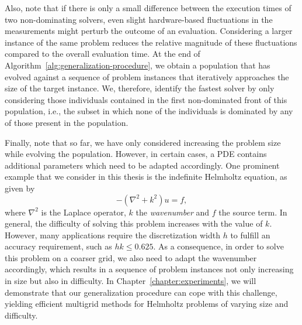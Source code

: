 Also, note that if there is only a small difference between the execution times of two non-dominating solvers, even slight hardware-based fluctuations in the measurements might perturb the outcome of an evaluation.
Considering a larger instance of the same problem reduces the relative magnitude of these fluctuations compared to the overall evaluation time.
At the end of Algorithm~\ref{alg:generalization-procedure}, we obtain a population that has evolved against a sequence of problem instances that iteratively approaches the size of the target instance.
We, therefore, identify the fastest solver by only considering those individuals contained in the first non-dominated front of this population, i.e., the subset in which none of the individuals is dominated by any of those present in the population.

Finally, note that so far, we have only considered increasing the problem size while evolving the population.
However, in certain cases, a PDE contains additional parameters which need to be adapted accordingly.
One prominent example that we consider in this thesis is the indefinite Helmholtz equation, as given by
\begin{equation}
	-(\nabla^{2} + k^{2})u = f,
\end{equation}
where $\nabla^{2}$ is the Laplace operator, $k$ the \emph{wavenumber} and $f$ the source term.
In general, the difficulty of solving this problem increases with the value of $k$.
However, many applications require the discretization width $h$ to fulfill an accuracy requirement, such as $h k \leq 0.625$. 
As a consequence, in order to solve this problem on a coarser grid, we also need to adapt the wavenumber accordingly, which results in a sequence of problem instances not only increasing in size but also in difficulty.
In Chapter~\ref{chapter:experiments}, we will demonstrate that our generalization procedure can cope with this challenge, yielding efficient multigrid methods for Helmholtz problems of varying size and difficulty.

